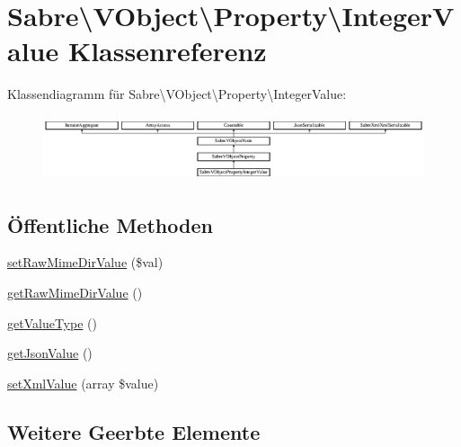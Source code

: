 \hypertarget{class_sabre_1_1_v_object_1_1_property_1_1_integer_value}{}\section{Sabre\textbackslash{}V\+Object\textbackslash{}Property\textbackslash{}Integer\+Value Klassenreferenz}
\label{class_sabre_1_1_v_object_1_1_property_1_1_integer_value}
Klassendiagramm für Sabre\textbackslash{}V\+Object\textbackslash{}Property\textbackslash{}Integer\+Value\+:\begin{figure}[H]
\begin{center}
\leavevmode
\includegraphics[height=1.922747cm]{class_sabre_1_1_v_object_1_1_property_1_1_integer_value}
\end{center}
\end{figure}
\subsection*{Öffentliche Methoden}
\begin{DoxyCompactItemize}
\item 
\mbox{\hyperlink{class_sabre_1_1_v_object_1_1_property_1_1_integer_value_acb60394cb1ecfb5b0b523601c05a8fdc}{set\+Raw\+Mime\+Dir\+Value}} (\$val)
\item 
\mbox{\hyperlink{class_sabre_1_1_v_object_1_1_property_1_1_integer_value_af8410affb4955c55a8145378e4ad2bb0}{get\+Raw\+Mime\+Dir\+Value}} ()
\item 
\mbox{\hyperlink{class_sabre_1_1_v_object_1_1_property_1_1_integer_value_a5d1d1292b993a8317f9d8aff316b9697}{get\+Value\+Type}} ()
\item 
\mbox{\hyperlink{class_sabre_1_1_v_object_1_1_property_1_1_integer_value_a11a1ace366d20bd9c75d89603bd90a3a}{get\+Json\+Value}} ()
\item 
\mbox{\hyperlink{class_sabre_1_1_v_object_1_1_property_1_1_integer_value_aa5764004cad757b839c18c7865911779}{set\+Xml\+Value}} (array \$value)
\end{DoxyCompactItemize}
\subsection*{Weitere Geerbte Elemente}


